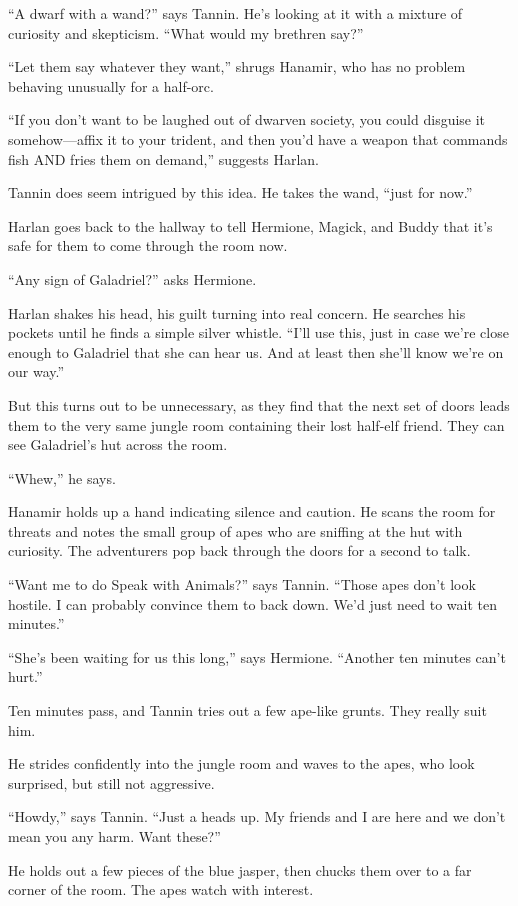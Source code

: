 \documentclass[smalldemyvopaper,11pt,twoside,onecolumn,openright,extrafontsizes]{memoir}
\begin{document}
``A dwarf with a wand?'' says Tannin. He's looking at it with a mixture
of curiosity and skepticism. ``What would my brethren say?''

``Let them say whatever they want,'' shrugs Hanamir, who has no problem
behaving unusually for a half-orc.

``If you don't want to be laughed out of dwarven society, you could
disguise it somehow---affix it to your trident, and then you'd have a
weapon that commands fish AND fries them on demand,'' suggests Harlan.

Tannin does seem intrigued by this idea. He takes the wand, ``just for
now.''

Harlan goes back to the hallway to tell Hermione, Magick, and Buddy that
it's safe for them to come through the room now.

``Any sign of Galadriel?'' asks Hermione.

Harlan shakes his head, his guilt turning into real concern. He searches
his pockets until he finds a simple silver whistle. ``I'll use this,
just in case we're close enough to Galadriel that she can hear us. And
at least then she'll know we're on our way.''

But this turns out to be unnecessary, as they find that the next set of
doors leads them to the very same jungle room containing their lost
half-elf friend. They can see Galadriel's hut across the room.

``Whew,'' he says.

Hanamir holds up a hand indicating silence and caution. He scans the
room for threats and notes the small group of apes who are sniffing at
the hut with curiosity. The adventurers pop back through the doors for a
second to talk.

``Want me to do Speak with Animals?'' says Tannin. ``Those apes don't
look hostile. I can probably convince them to back down. We'd just need
to wait ten minutes.''

``She's been waiting for us this long,'' says Hermione. ``Another ten
minutes can't hurt.''

Ten minutes pass, and Tannin tries out a few ape-like grunts. They
really suit him.

He strides confidently into the jungle room and waves to the apes, who
look surprised, but still not aggressive.

``Howdy,'' says Tannin. ``Just a heads up. My friends and I are here and
we don't mean you any harm. Want these?''

He holds out a few pieces of the blue jasper, then chucks them over to a
far corner of the room. The apes watch with interest.
\end{document}
